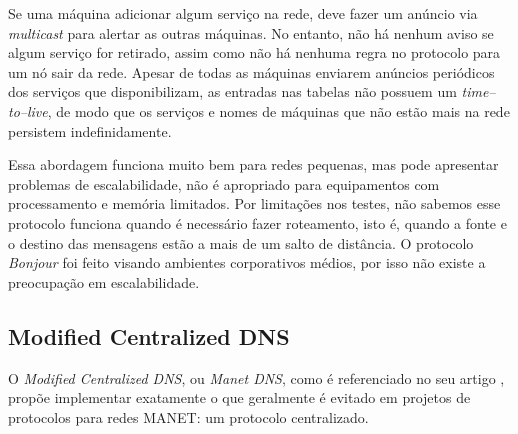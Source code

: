     Se uma máquina adicionar algum serviço na rede, deve fazer um anúncio via \textit{multicast} para alertar as outras máquinas. No entanto, não há nenhum aviso se algum serviço for retirado, assim como não há nenhuma regra no protocolo para um nó sair da rede. Apesar de todas as máquinas enviarem anúncios periódicos dos serviços que disponibilizam, as entradas nas tabelas não possuem um \textit{time--to--live}, de modo que os serviços e nomes de máquinas que não estão mais na rede persistem indefinidamente.
    
    Essa abordagem funciona muito bem para redes pequenas, mas pode apresentar problemas de escalabilidade, não é apropriado para equipamentos com processamento e memória limitados. Por limitações nos testes, não sabemos esse protocolo funciona quando é necessário fazer roteamento, isto é, quando a fonte e o destino das mensagens estão a mais de um salto de distância. O protocolo \textit{Bonjour} foi feito visando ambientes corporativos médios, por isso não existe a preocupação em escalabilidade.


\subsection{Modified Centralized DNS}

  O \textit{Modified Centralized DNS}, ou \textit{Manet DNS}, como é referenciado no seu artigo \cite{mcdns}, propõe implementar exatamente o que geralmente é evitado em projetos de protocolos para redes MANET: um protocolo centralizado.